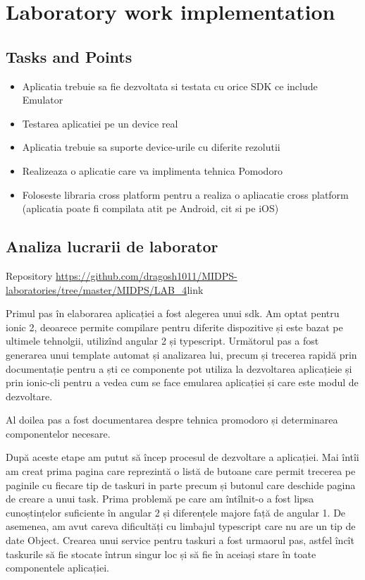 \section{Laboratory work implementation}

\subsection{Tasks and Points}

\begin{itemize}
	\item Aplicatia trebuie sa fie dezvoltata si testata cu orice SDK ce include Emulator
	\item Testarea aplicatiei pe un device real
	\item Aplicatia trebuie sa suporte device-urile cu diferite rezolutii
	\item Realizeaza o aplicatie care va implimenta tehnica Pomodoro
	\item Foloseste libraria cross platform pentru a realiza o apliacatie cross platform (aplicatia poate fi compilata atit pe Android, cit si pe iOS)
\end{itemize}

\subsection{Analiza lucrarii de laborator}

Repository \url{https://github.com/dragosh1011/MIDPS-laboratories/tree/master/MIDPS/LAB_4}{link}

Primul pas în elaborarea aplicației a fost alegerea unui sdk. Am optat pentru ionic 2\cite{ionic}, deoarece permite compilare pentru diferite dispozitive și este bazat pe ultimele tehnolgii, utilizînd angular 2 și typescript. Următorul pas a fost generarea unui template automat și analizarea lui, precum și trecerea rapidă prin documentație pentru a ști ce componente pot utiliza la dezvoltarea aplicațieie și prin ionic-cli\cite{ionic-cli} pentru a vedea cum se face emularea aplicației și care este modul de dezvoltare.

Al doilea pas a fost documentarea despre tehnica promodoro\cite{promodoro} și determinarea componentelor necesare. 

După aceste etape am putut să încep procesul de dezvoltare a aplicației. Mai întîi am creat prima pagina care reprezintă o listă de butoane care permit trecerea pe paginile cu fiecare tip de taskuri in parte precum și butonul care deschide pagina de creare a unui task. Prima problemă pe care am întîlnit-o a fost lipsa cunoștințelor suficiente în angular 2\cite{angular2} și diferențele majore față de angular 1. De asemenea, am avut careva dificultăți cu limbajul typescript care nu are un tip de date Object. Crearea unui service pentru taskuri a fost urmaorul pas, astfel încît taskurile să fie stocate întrun singur loc și să fie în aceiași stare în toate componentele aplicației. 

